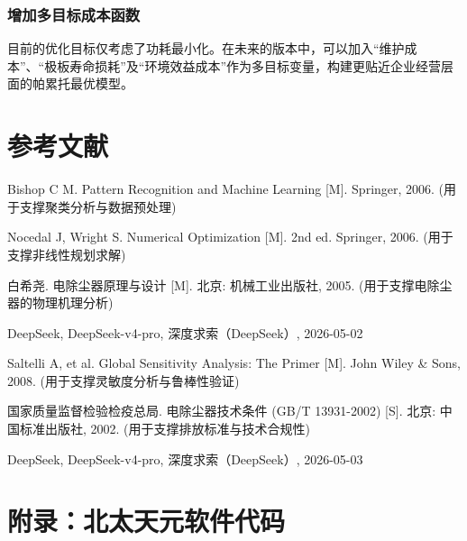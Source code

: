 \documentclass[UTF8, a4paper]{ctexart}
\begin{document}
\subsubsection{增加多目标成本函数} 目前的优化目标仅考虑了功耗最小化。在未来的版本中，可以加入“维护成本”、“极板寿命损耗”及“环境效益成本”作为多目标变量，构建更贴近企业经营层面的帕累托最优模型。
\section{参考文献}
\begin{enumerate}[label={[\arabic*]}, leftmargin=3em]
   \item Bishop C M. Pattern Recognition and Machine Learning [M]. Springer, 2006. (用于支撑聚类分析与数据预处理)
    \item Nocedal J, Wright S. Numerical Optimization [M]. 2nd ed. Springer, 2006. (用于支撑非线性规划求解) 
    \item 白希尧. 电除尘器原理与设计 [M]. 北京: 机械工业出版社, 2005. (用于支撑电除尘器的物理机理分析) 
    \item DeepSeek, DeepSeek-v4-pro, 深度求索（DeepSeek）, 2026-05-02
    \item Saltelli A, et al. Global Sensitivity Analysis: The Primer [M]. John Wiley & Sons, 2008. (用于支撑灵敏度分析与鲁棒性验证)     
    \item 国家质量监督检验检疫总局. 电除尘器技术条件 (GB/T 13931-2002) [S]. 北京: 中国标准出版社, 2002. (用于支撑排放标准与技术合规性)
    \item DeepSeek, DeepSeek-v4-pro, 深度求索（DeepSeek）, 2026-05-03
\end{enumerate}

\newpage
\appendix
\section*{附录：北太天元软件代码}
\end{document}
